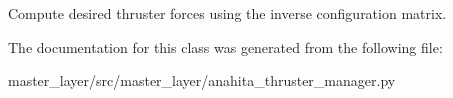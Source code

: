 \begin{DoxyVerb}Compute desired thruster forces using the inverse configuration
matrix.
\end{DoxyVerb}
 

The documentation for this class was generated from the following file\+:\begin{DoxyCompactItemize}
\item 
master\+\_\+layer/src/master\+\_\+layer/anahita\+\_\+thruster\+\_\+manager.\+py\end{DoxyCompactItemize}
